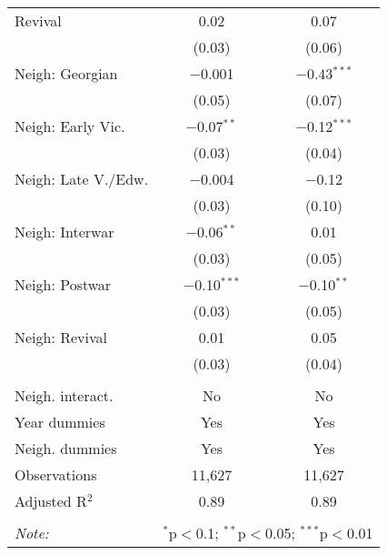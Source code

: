 \begin{table}[!htbp]
\begin{tabular}{@{\extracolsep{5pt}}lcc}
  Revival & 0.02 & 0.07 \\ 
  & (0.03) & (0.06) \\ 
  Neigh: Georgian & $-$0.001 & $-$0.43$^{***}$ \\ 
  & (0.05) & (0.07) \\ 
  Neigh: Early Vic. & $-$0.07$^{**}$ & $-$0.12$^{***}$ \\ 
  & (0.03) & (0.04) \\ 
  Neigh: Late V./Edw. & $-$0.004 & $-$0.12 \\ 
  & (0.03) & (0.10) \\ 
  Neigh: Interwar & $-$0.06$^{**}$ & 0.01 \\ 
  & (0.03) & (0.05) \\ 
  Neigh: Postwar & $-$0.10$^{***}$ & $-$0.10$^{**}$ \\ 
  & (0.03) & (0.05) \\ 
  Neigh: Revival & 0.01 & 0.05 \\ 
  & (0.03) & (0.04) \\ 
 \hline \\[-1.8ex] 
Neigh. interact. & No & No \\ 
Year dummies & Yes & Yes \\ 
Neigh. dummies & Yes & Yes \\ 
Observations & 11,627 & 11,627 \\ 
Adjusted R$^{2}$ & 0.89 & 0.89 \\ 
\hline 
\hline \\[-1.8ex] 
\textit{Note:}  & \multicolumn{2}{r}{$^{*}$p$<$0.1; $^{**}$p$<$0.05; $^{***}$p$<$0.01} \\ 
\end{tabular} 
\end{table} 
